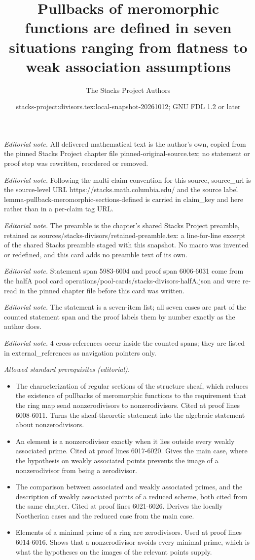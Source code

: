 \documentclass[10pt,a4paper]{amsart}
\title{Pullbacks of meromorphic functions are defined in seven situations ranging from flatness to weak association assumptions}
\author{The Stacks Project Authors}
\date{stacks-project:divisors.tex:local-snapshot-20261012; GNU FDL 1.2 or later}
\theoremstyle{plain}
\theoremstyle{definition}
\theoremstyle{remark}
\numberwithin{equation}{subsection}
\begin{document}
\maketitle
\noindent\textit{Editorial note.} All delivered mathematical text is the author's own, copied from the pinned Stacks Project chapter file pinned-original-source.tex; no statement or proof step was rewritten, reordered or removed.\par\medskip
\noindent\textit{Editorial note.} Following the multi-claim convention for this source, source\_url is the source-level URL https://stacks.math.columbia.edu/ and the source label lemma-pullback-meromorphic-sections-defined is carried in claim\_key and here rather than in a per-claim tag URL.\par\medskip
\noindent\textit{Editorial note.} The preamble is the chapter's shared Stacks Project preamble, retained as sources/stacks-divisors/retained-preamble.tex: a line-for-line excerpt of the shared Stacks preamble staged with this snapshot. No macro was invented or redefined, and this card adds no preamble text of its own.\par\medskip
\noindent\textit{Editorial note.} Statement span 5983-6004 and proof span 6006-6031 come from the halfA pool card operations/pool-cards/stacks-divisors-halfA.json and were re-read in the pinned chapter file before this card was written.\par\medskip
\noindent\textit{Editorial note.} The statement is a seven-item list; all seven cases are part of the counted statement span and the proof labels them by number exactly as the author does.\par\medskip
\noindent\textit{Editorial note.} 4 cross-references occur inside the counted spans; they are listed in external\_references as navigation pointers only.\par\medskip
\noindent\textit{Allowed standard prerequisites (editorial).}\begin{itemize}
\item The characterization of regular sections of the structure sheaf, which reduces the existence of pullbacks of meromorphic functions to the requirement that the ring map send nonzerodivisors to nonzerodivisors. Cited at proof lines 6008-6011. Turns the sheaf-theoretic statement into the algebraic statement about nonzerodivisors.
\item An element is a nonzerodivisor exactly when it lies outside every weakly associated prime. Cited at proof lines 6017-6020. Gives the main case, where the hypothesis on weakly associated points prevents the image of a nonzerodivisor from being a zerodivisor.
\item The comparison between associated and weakly associated primes, and the description of weakly associated points of a reduced scheme, both cited from the same chapter. Cited at proof lines 6021-6026. Derives the locally Noetherian cases and the reduced case from the main case.
\item Elements of a minimal prime of a ring are zerodivisors. Used at proof lines 6014-6016. Shows that a nonzerodivisor avoids every minimal prime, which is what the hypotheses on the images of the relevant points supply.
\end{itemize}\medskip
\end{document}
